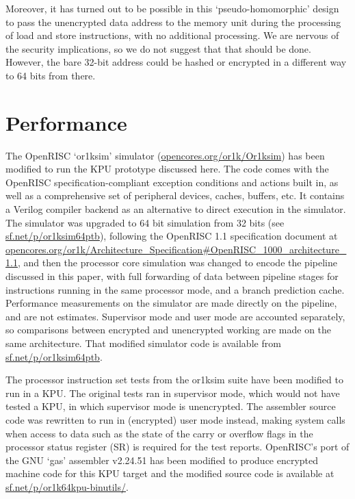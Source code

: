 \documentclass[conference]{IEEEtran}
\begin{document}
Moreover, it has turned out to be possible in this `pseudo-homomorphic'
design to pass the unencrypted data address to the memory unit
during the processing of load and store instructions, with no additional
processing.  We are nervous of the security implications, so we do not
suggest that that should be done.  However, the bare 32-bit address
could be hashed or encrypted in a different way to 64 bits from there.

\section{Performance}

The OpenRISC `or1ksim' simulator
(\url{opencores.org/or1k/Or1ksim}) has been modified to run the
KPU prototype discussed here.  The code comes with the OpenRISC
specification-compliant exception conditions and actions built in, as
well as a comprehensive set of peripheral devices, caches, buffers, etc.
It contains a Verilog compiler backend as an alternative to direct
execution in the simulator.  The simulator was upgraded to 64 bit
simulation from 32 bits (see \url{sf.net/p/or1ksim64ptb}), following the
OpenRISC 1.1 specification document at
\url{opencores.org/or1k/Architecture_Specification#OpenRISC_1000_architecture_1.1},
and then the processor core simulation was changed to encode
the pipeline discussed in this paper, with full forwarding of data
between pipeline stages for instructions running in the same processor
mode, and a branch prediction cache.  Performance measurements on the
simulator are made directly on the pipeline, and are not estimates.
Supervisor mode and user mode are accounted separately, so comparisons
between encrypted and unencrypted working are made on the same
architecture.  That modified simulator code is available from
\url{sf.net/p/or1ksim64ptb}.

The processor instruction set tests from the or1ksim suite have been
modified to run in a KPU.  The original tests ran in supervisor mode,
which would not have tested a KPU, in which supervisor mode is
unencrypted.  The assembler source code was rewritten to run in
(encrypted) user mode instead, making system calls when access to data
such as the state of the carry or overflow flags in the processor status
register (SR) is required for the test reports.  OpenRISC's port of the
GNU `gas' assembler v2.24.51 has been modified to produce encrypted
machine code for this KPU target and the modified source code is
available at \url{sf.net/p/or1k64kpu-binutils/}.
\end{document}
